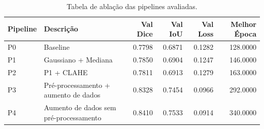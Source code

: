 \begin{table}
\caption{Tabela de ablação das pipelines avaliadas.}
\label{tab:ablacao_pipelines}
\begin{tabular}{llrrrr}
\toprule
Pipeline & Descrição & Val Dice & Val IoU & Val Loss & Melhor Época \\
\midrule
P0 & Baseline & 0.7798 & 0.6871 & 0.1282 & 128.0000 \\
P1 & Gaussiano + Mediana & 0.7850 & 0.6904 & 0.1247 & 146.0000 \\
P2 & P1 + CLAHE & 0.7811 & 0.6913 & 0.1279 & 163.0000 \\
P3 & Pré-processamento + aumento de dados & 0.8328 & 0.7454 & 0.0966 & 292.0000 \\
P4 & Aumento de dados sem pré-processamento & 0.8410 & 0.7533 & 0.0914 & 340.0000 \\
\bottomrule
\end{tabular}
\end{table}
